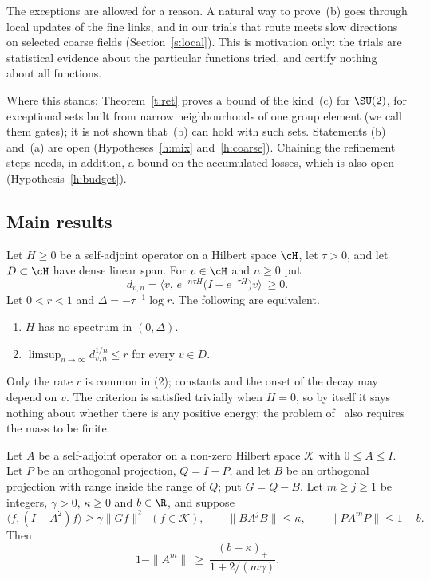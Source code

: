 The exceptions are allowed for a reason. A natural way to prove~(b) goes through local updates of the fine
links, and in our trials that route meets slow directions on selected coarse fields (Section~\ref{s:local}).
This is motivation only: the trials are statistical evidence about the particular functions tried, and
certify nothing about all functions.

Where this stands: Theorem~\ref{t:ret} proves a bound of the kind~(c) for $\SU(2)$, for exceptional sets
built from narrow neighbourhoods of one group element (we call them gates); it is not shown that~(b) can
hold with such sets. Statements (b) and~(a)
are open (Hypotheses~\ref{h:mix} and~\ref{h:coarse}). Chaining the refinement steps needs, in addition, a
bound on the accumulated losses, which is also open (Hypothesis~\ref{h:budget}).

\subsection{Main results}
\begin{theorem}\label{t:crit}
Let $H\ge0$ be a self-adjoint operator on a Hilbert space $\cH$, let $\tau>0$, and let $D\subset\cH$ have dense
linear span. For $v\in\cH$ and $n\ge0$ put
\[
d_{v,n}=\big\langle v,\,e^{-n\tau H}\big(I-e^{-\tau H}\big)v\big\rangle\ \ge0 .
\]
Let $0<r<1$ and $\Delta=-\tau^{-1}\log r$. The following are equivalent.
\begin{enumerate}
\item $H$ has no spectrum in $(0,\Delta)$.
\item $\limsup_{n\to\infty}d_{v,n}^{1/n}\le r$ for every $v\in D$.
\end{enumerate}
\end{theorem}

Only the rate $r$ is common in (2); constants and the onset of the decay may depend on $v$. The criterion is
satisfied trivially when $H=0$, so by itself it says nothing about whether there is any positive energy; the
problem of~\cite{JW} also requires the mass to be finite.

\begin{theorem}\label{t:inh}
Let $A$ be a self-adjoint operator on a non-zero Hilbert space $\mathcal K$ with $0\le A\le I$. Let $P$ be an
orthogonal projection, $Q=I-P$, and let $B$ be an orthogonal projection with range inside the range of $Q$;
put $G=Q-B$. Let $m\ge j\ge1$ be integers, $\gamma>0$, $\kappa\ge0$ and $b\in\R$, and suppose
\begin{equation}\label{e:hyp}
\langle f,(I-A^{2})f\rangle\ge\gamma\|Gf\|^2\ \ (f\in\mathcal K),\qquad
\|BA^{j}B\|\le\kappa,\qquad \|PA^{m}P\|\le1-b .
\end{equation}
Then
\begin{equation}\label{e:inh}
1-\|A^m\|\ \ge\ \frac{(b-\kappa)_+}{1+2/(m\gamma)} .
\end{equation}
\end{theorem}

